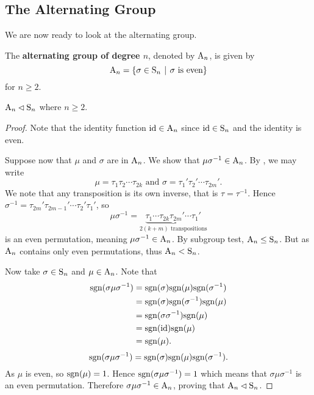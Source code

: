 \subsection{The Alternating Group}
We are now ready to look at the alternating group.
\begin{definition}
    The \textbf{alternating group of degree $n$}, denoted by $\mathrm{A}_{n}$, is given by
    \[
        \An{n} = \left\{\sigma \in \Sn{n} \vert \sigma \text{ is even}\right\}
    \]
    for $n \geq 2$.
\end{definition}

\begin{proposition}\label{prop-An-normal-subgroup-of-Sn}
    $\mathrm{A}_{n} \lhd \mathrm{S}_{n}$ where $n \geq 2$.
\end{proposition}
\begin{proof}
    Note that the identity function $\mathrm{id} \in \mathrm{A}_{n}$ since $\mathrm{id} \in \mathrm{S}_{n}$ and the identity is even.

    Suppose now that $\mu$ and $\sigma$ are in $\mathrm{A}_{n}$. We show that $\mu\sigma^{-1} \in \mathrm{A}_{n}$. By , we may write
    \[
        \mu = \tau_1\tau_2\cdots\tau_{2k} \text{ and } \sigma = \tau_1'\tau_2'\cdots\tau_{2m}'.
    \]
    We note that any transposition is its own inverse, that is $\tau = \tau^{-1}$. Hence $\sigma^{-1} = \tau_{2m}'\tau_{2m-1}'\cdots\tau_2'\tau_1'$, so
    \[
        \mu\sigma^{-1} = \underbrace{\tau_1\cdots\tau_{2k}\tau_{2m}'\cdots\tau_1'}_{2(k+m) \text{ transpositions}}
    \]
    is an even permutation, meaning $\mu\sigma^{-1} \in \mathrm{A}_{n}$. By subgroup test, $\mathrm{A}_{n} \leq \mathrm{S}_{n}$. But as $\mathrm{A}_{n}$ contains only even permutations, thus $\mathrm{A}_{n} < \mathrm{S}_{n}$.

    Now take $\sigma \in \mathrm{S}_{n}$ and $\mu \in \mathrm{A}_{n}$. Note that
    \begin{align*}
        \mathrm{sgn}(\sigma\mu\sigma^{-1}) &= \mathrm{sgn}(\sigma)\mathrm{sgn}(\mu)\mathrm{sgn}(\sigma^{-1})\\
        &= \mathrm{sgn}(\sigma)\mathrm{sgn}(\sigma^{-1})\mathrm{sgn}(\mu)\\
        &= \mathrm{sgn}(\sigma\sigma^{-1})\mathrm{sgn}(\mu)\\
        &= \mathrm{sgn}(\mathrm{id})\mathrm{sgn}(\mu)\\
        &= \mathrm{sgn}(\mu).
    \end{align*}
    \[
        \mathrm{sgn}(\sigma\mu\sigma^{-1}) = \mathrm{sgn}(\sigma)\mathrm{sgn}(\mu)\mathrm{sgn}(\sigma^{-1}).
    \]
    As $\mu$ is even, so $\mathrm{sgn}(\mu) = 1$. Hence $\mathrm{sgn}(\sigma\mu\sigma^{-1}) = 1$ which means that $\sigma\mu\sigma^{-1}$ is an even permutation. Therefore $\sigma\mu\sigma^{-1} \in \mathrm{A}_{n}$, proving that $\mathrm{A}_{n} \lhd \mathrm{S}_{n}$.
\end{proof}

